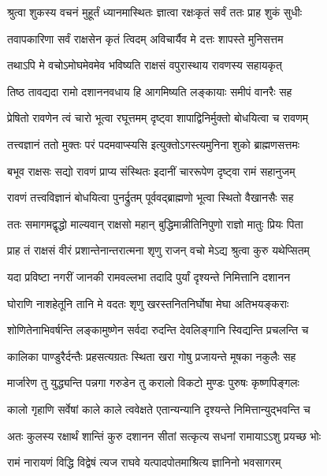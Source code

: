 \twolineshloka
{श्रुत्वा शुकस्य वचनं मुहूर्तं ध्यानमास्थितः}
{ज्ञात्वा रक्षःकृतं सर्वं ततः प्राह शुकं सुधीः} %

\twolineshloka
{तवापकारिणा सर्वं राक्षसेन कृतं त्विदम्}
{अविचार्यैव मे दत्तः शापस्ते मुनिसत्तम} %

\twolineshloka
{तथाऽपि मे वचोऽमोघमेवमेव भविष्यति}
{राक्षसं वपुरास्थाय रावणस्य सहायकृत्} %

\twolineshloka
{तिष्ठ तावद्यदा रामो दशाननवधाय हि}
{आगमिष्यति लङ्कायाः समीपं वानरैः सह} %

\twolineshloka
{प्रेषितो रावणेन त्वं चारो भूत्वा रघूत्तमम्}
{दृष्ट्वा शापाद्विनिर्मुक्तो बोधयित्वा च रावणम्} %

\twolineshloka
{तत्त्वज्ञानं ततो मुक्तः परं पदमवाप्स्यसि}
{इत्युक्तोऽगस्त्यमुनिना शुको ब्राह्मणसत्तमः} %

\twolineshloka
{बभूव राक्षसः सद्यो रावणं प्राप्य संस्थितः}
{इदानीं चाररूपेण दृष्ट्वा रामं सहानुजम्} %

\twolineshloka
{रावणं तत्त्वविज्ञानं बोधयित्वा पुनर्द्रुतम्}
{पूर्ववद्ब्राह्मणो भूत्वा स्थितो वैखानसैः सह} %

\twolineshloka
{ततः समागमद्वृद्धो माल्यवान् राक्षसो महान्}
{बुद्धिमान्नीतिनिपुणो राज्ञो मातुः प्रियः पिता} %

\twolineshloka
{प्राह तं राक्षसं वीरं प्रशान्तेनान्तरात्मना}
{शृणु राजन् वचो मेऽद्य श्रुत्वा कुरु यथेप्सितम्} %

\twolineshloka
{यदा प्रविष्टा नगरीं जानकी रामवल्लभा}
{तदादि पुर्यां दृश्यन्ते निमित्तानि दशानन} %

\twolineshloka
{घोराणि नाशहेतूनि तानि मे वदतः शृणु}
{खरस्तनितनिर्घोषा मेघा अतिभयङ्कराः} %

\twolineshloka
{शोणितेनाभिवर्षन्ति लङ्कामुष्णेन सर्वदा}
{रुदन्ति देवलिङ्गानि स्विद्यन्ति प्रचलन्ति च} %

\twolineshloka
{कालिका पाण्डुरैर्दन्तैः प्रहसत्यग्रतः स्थिता}
{खरा गोषु प्रजायन्ते मूषका नकुलैः सह} %

\twolineshloka
{मार्जारेण तु युद्ध्यन्ति पन्नगा गरुडेन तु}
{करालो विकटो मुण्डः पुरुषः कृष्णपिङ्गलः} %

\twolineshloka
{कालो गृहाणि सर्वेषां काले काले त्ववेक्षते}
{एतान्यन्यानि दृश्यन्ते निमित्तान्युद्भवन्ति च} %

\twolineshloka
{अतः कुलस्य रक्षार्थं शान्तिं कुरु दशानन}
{सीतां सत्कृत्य सधनां रामायाऽऽशु प्रयच्छ भोः} %

\twolineshloka
{रामं नारायणं विद्धि विद्वेषं त्यज राघवे}
{यत्पादपोतमाश्रित्य ज्ञानिनो भवसागरम्} %


